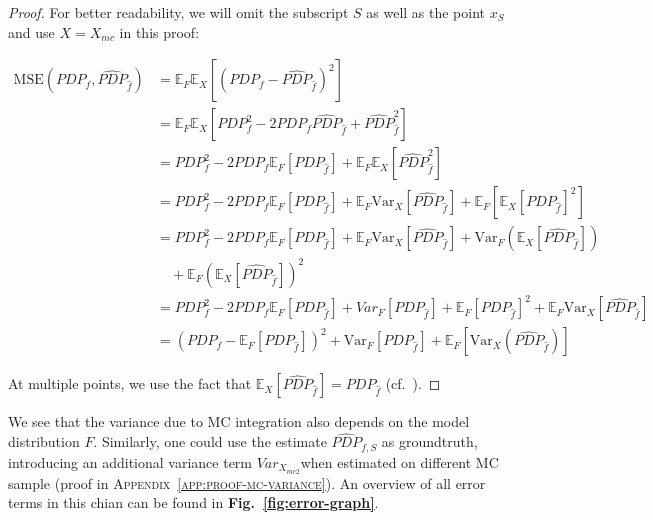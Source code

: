 \documentclass[runningheads]{llncs}
\begin{document}
\begin{proof}
    For better readability, we will omit the subscript $S$ as well as the point $x_S$ and use $X=X_{mc}$ in this proof:

    \begin{align*}
        \text{MSE}(PDP_{f}, \widehat{PDP}_{\hat f})
         & = \mathbb{E}_F\mathbb{E}_X[(PDP_f - \widehat{PDP}_{\hat f})^2]                                                                                         \\
         & = \mathbb{E}_F \mathbb{E}_X[PDP_f^2 - 2PDP_f\widehat{PDP}_{\hat f} + \widehat{PDP}_{\hat f}^2]                                                         \\
         & = PDP_f^2 - 2PDP_f\mathbb{E}_F[PDP_{\hat f}] + \mathbb{E}_F\mathbb{E}_X[\widehat{PDP}_{\hat f}^2]                                                      \\
         & = PDP_f^2 - 2PDP_f\mathbb{E}_F[PDP_{\hat f}] + \mathbb{E}_F\text{Var}_X[\widehat{PDP}_{\hat f}] + \mathbb{E}_F[\mathbb{E}_X[\widehat{PDP}_{\hat f}]^2] \\
         & = PDP_f^2 - 2PDP_f\mathbb{E}_F[PDP_{\hat f}] + \mathbb{E}_F\text{Var}_X[\widehat{PDP}_{\hat f}] + \text{Var}_F(\mathbb{E}_X[\widehat{PDP}_{\hat f}])   \\
         & \quad + \mathbb{E}_F(\mathbb{E}_X[\widehat{PDP}_{\hat f}])^2                                                                                           \\
         & = PDP_f^2 - 2PDP_f\mathbb{E}_F[PDP_{\hat f}] +  Var_F[PDP_{\hat f}] + \mathbb{E}_F[PDP_{\hat f}]^2 + \mathbb{E}_F\text{Var}_X[\widehat{PDP}_{\hat f}]  \\
         & = (PDP_f - \mathbb{E}_F[PDP_{\hat f}])^2 + \text{Var}_F[PDP_{\hat f}] + \mathbb{E}_F[\text{Var}_X(\widehat{PDP}_{\hat f})]
    \end{align*}

    \noindent At multiple points, we use the fact that $\mathbb{E}_X[\widehat{PDP}_{\hat f}]
        = PDP_{\hat f}$ (cf.~\cite{molnar_relating_2023}).
\end{proof}

\noindent We see that the variance due to MC integration also depends on the model
distribution $F$. Similarly, one could use the estimate $\widehat{PDP}_{f,S}$
as groundtruth, introducing an additional variance term $Var_{X_{mc2}}$when
estimated on different MC sample (proof in
\textsc{Appendix~\ref{app:proof-mc-variance}}).
An overview of all error terms in this chian can be found in
\textbf{Fig.\@~\ref{fig:error-graph}}.\\
\end{document}
